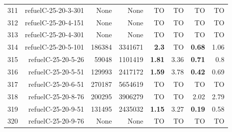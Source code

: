 \begin{longtable}{lrr@{\hskip 12pt}r@{\hskip 12pt}r@{\hskip 12pt}r@{\hskip 12pt}r@{\hskip 12pt}r}
311 & \multirow{1}{*}{refuelC-25-20-3-301} & \multirow{1}{*}{None} & \multirow{1}{*}{None} & TO & TO & TO & TO \\
312 & \multirow{1}{*}{refuelC-25-20-4-151} & \multirow{1}{*}{None} & \multirow{1}{*}{None} & TO & TO & TO & TO \\
313 & \multirow{1}{*}{refuelC-25-20-4-301} & \multirow{1}{*}{None} & \multirow{1}{*}{None} & TO & TO & TO & TO \\
314 & \multirow{1}{*}{refuelC-25-20-5-101} & \multirow{1}{*}{186384} & \multirow{1}{*}{3341671} & \textbf{2.3} & TO & \textbf{0.68} & 1.06 \\
315 & \multirow{1}{*}{refuelC-25-20-5-26} & \multirow{1}{*}{59048} & \multirow{1}{*}{1101419} & \textbf{1.81} & 3.36 & \textbf{0.71} & 0.8 \\
316 & \multirow{1}{*}{refuelC-25-20-5-51} & \multirow{1}{*}{129993} & \multirow{1}{*}{2417172} & \textbf{1.59} & 3.78 & \textbf{0.42} & 0.69 \\
317 & \multirow{1}{*}{refuelC-25-20-6-51} & \multirow{1}{*}{270187} & \multirow{1}{*}{5654619} & TO & TO & TO & TO \\
318 & \multirow{1}{*}{refuelC-25-20-8-76} & \multirow{1}{*}{200295} & \multirow{1}{*}{3906279} & TO & TO & 2.02 & 2.79 \\
319 & \multirow{1}{*}{refuelC-25-20-9-51} & \multirow{1}{*}{131495} & \multirow{1}{*}{2435032} & \textbf{1.15} & 3.27 & \textbf{0.19} & 0.58 \\
320 & \multirow{1}{*}{refuelC-25-20-9-76} & \multirow{1}{*}{None} & \multirow{1}{*}{None} & TO & TO & TO & TO \\
\bottomrule
\end{longtable}